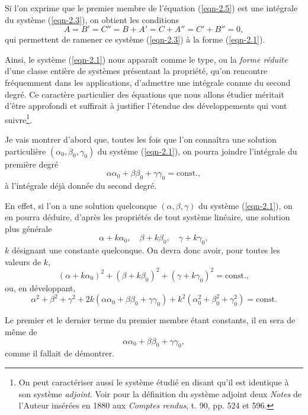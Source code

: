 Si l'on exprime que le premier membre de l'équation (\ref{eqn-2.5}) est une intégrale du système (\ref{eqn-2.3}), on 
obtient les conditions
\[
A = B' = C'' = B + A' = C + A'' = C' + B'' = 0,
\]
qui permettent de ramener ce système (\ref{eqn-2.3}) à la forme (\ref{eqn-2.1}).

Ainsi, le système (\ref{eqn-2.1}) nous apparaît comme le type, ou la \textit{forme réduite} d'une classe entière de 
systèmes présentant la propriété, qu'on rencontre fréquemment dans les applications, d'admettre une intégrale connue du 
second degré. Ce caractère particulier des équations que nous allons étudier méritait d'être approfondi et suffirait à 
justifier l'étendue des développements qui vont suivre\footnote{On peut caractériser aussi le système étudié en disant 
qu'il est identique à son système \textit{adjoint}. Voir pour la définition du système adjoint deux \textit{Notes} de 
l'Auteur insérées en 1880 aux \textit{Comptes rendus}, t. 90, pp. 524 et 596.}.

 Je vais montrer d'abord que, toutes les fois que l'on connaîtra une solution particulière $(\alpha_0, 
\beta_0, \gamma_0)$ du système (\ref{eqn-2.1}), on pourra joindre l'intégrale du première degré
\[
\alpha\alpha_0 + \beta\beta_0 + \gamma\gamma_0 = \textrm{const.},
\]
à l'intégrale déjà donnée du second degré.

En effet, si l'on a une solution quelconque $(\alpha, \beta, \gamma)$ du système (\ref{eqn-2.1}), on en pourra déduire, 
d'après les propriétés de tout système linéaire, une solution plus générale
\[
\alpha + k\alpha_0, \quad \beta + k\beta_0, \quad \gamma + k\gamma_0,
\]
$k$ désignant une constante quelconque. On devra donc avoir, pour toutes les valeurs de $k$,
\[
(\alpha + k\alpha_0)^2 + (\beta + k\beta_0)^2 + (\gamma + k\gamma_0)^2 = \textrm{const.},
\]
ou, en développant,
\[
\alpha^2 + \beta^2 + \gamma^2 + 2k(\alpha\alpha_0 + \beta\beta_0 + \gamma\gamma_0) + k^2(\alpha_0^2 + \beta_0^2 + 
\gamma_0^2) = \textrm{const.}
\]

Le premier et le dernier terme du premier membre étant constants, il en sera de même de
\[
\alpha\alpha_0 + \beta\beta_0 + \gamma\gamma_0,
\]
comme il fallait de démontrer.

